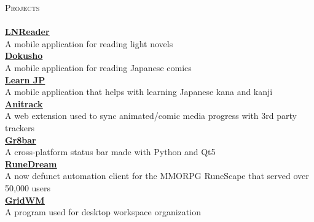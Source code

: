 \documentclass[a4paper]{article}
\newcommand{\lineunder} {
    \vspace*{-8pt} \\
    \hspace*{-18pt} \hrulefill \\
}
\newcommand{\header} [1] {
    {\hspace*{-18pt}\vspace*{6pt} \textsc{#1}}
    \vspace*{-6pt} \lineunder
}
\begin{document}
\header{Projects}
{\textbf{\href{https://sedlar.me/lnreader}{\ul{LNReader}}}}\\
\vspace*{1mm}
A mobile application for reading light novels\\
\vspace*{2mm}
{\textbf{\href{https://github.com/TSedlar/dokusho}{\ul{Dokusho}}}}\\
\vspace*{1mm}
A mobile application for reading Japanese comics\\
\vspace*{2mm}
{\textbf{\href{https://itunes.apple.com/us/app/learn-jp/id1447060691}{\ul{Learn JP}}}}\\
\vspace*{1mm}
A mobile application that helps with learning Japanese kana and kanji\\
\vspace*{2mm}
{\textbf{\href{https://github.com/TSedlar/anitrack}{\ul{Anitrack}}}}\\
\vspace*{1mm}
A web extension used to sync animated/comic media progress with 3rd party trackers\\
\vspace*{2mm}
{\textbf{\href{https://github.com/TSedlar/gr8bar}{\ul{Gr8bar}}}}\\
\vspace*{1mm}
A cross-platform status bar made with Python and Qt5\\
\vspace*{2mm}
{\textbf{\href{https://github.com/FThompson/RuneDream-API}{\ul{RuneDream}}}}\\
\vspace*{1mm}
A now defunct automation client for the MMORPG RuneScape that served over 50,000 users\\
\vspace*{2mm}
{\textbf{\href{https://github.com/TSedlar/GridWM}{\ul{GridWM}}}}\\
\vspace*{1mm}
A program used for desktop workspace organization\\
\vspace*{2mm}
\end{document}
